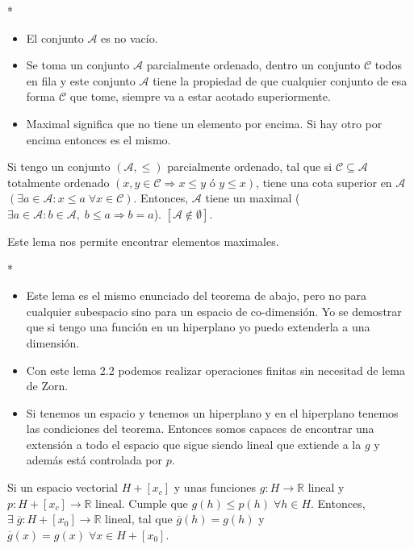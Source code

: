\begin{paracol}{2}
\switchcolumn[1]*{\noindent\scriptsize
\begin{itemize}
    \item El conjunto $\mathscr{A}$ es no vacío.
    \item Se toma un conjunto $\mathscr{A}$ parcialmente ordenado, dentro un conjunto $\mathscr{C}$ todos en fila y este conjunto $\mathscr{A}$ tiene la propiedad de que cualquier conjunto de esa forma $\mathscr{C}$ que tome, siempre va a estar acotado superiormente. 
    \item Maximal significa que no tiene un elemento por encima. Si hay otro por encima entonces es el mismo.
\end{itemize}
}
\switchcolumn[0]\noindent
\begin{lema} Si tengo un conjunto $\left(\mathscr{A},\leq\right)$ parcialmente ordenado, tal que si $\mathscr{C} \subseteq \mathscr{A}$ totalmente ordenado $\left(x,y \in \mathscr{C} \Rightarrow x\leq y \text{ ó } y\leq x\right)$, tiene una cota superior en $\mathscr{A}$ $\left(\exists a\in \mathscr{A}:x\leq a \;\forall x\in \mathscr{C}\right)$. Entonces, $\mathscr{A}$ tiene un maximal ($\exists a \in \mathscr{A}: b \in \mathscr{A},\; b\leq a \Rightarrow b=a$). $\left[\mathscr{A}\notin \emptyset\right]$.
\end{lema}

Este lema nos permite encontrar elementos maximales.

\switchcolumn[1]*{\noindent\scriptsize
    \begin{itemize}
	\item Este lema es el mismo enunciado del teorema de abajo, pero no para cualquier subespacio sino para un espacio de co-dimensión. Yo se demostrar que si tengo una función en un hiperplano yo puedo extenderla a una dimensión. 
	\item Con este lema 2.2 podemos realizar operaciones finitas sin necesitad de lema de Zorn.
	\item Si tenemos un espacio y tenemos un hiperplano y en el hiperplano tenemos las condiciones del teorema. Entonces somos capaces de encontrar una extensión a todo el espacio que sigue siendo lineal que extiende a la $g$ y además está controlada por $p$.
    \end{itemize}
}
\switchcolumn[0]\noindent

\begin{lema}
    Si un espacio vectorial $H+[x_c]$ y unas funciones $g:H\to \mathbb{R}$ lineal y $p:H+[x_c]\to \mathbb{R}$ lineal. Cumple que $g(h)\leq p(h)\; \forall h\in H$. Entonces, $\exists\; \overline{g}:H+[x_0]\to \mathbb{R}$ lineal, tal que $\overline{g}(h)=g(h)$ y $\overline{g}(x)=g(x)\; \forall x\in H+[x_0]$.


\end{lema}
\end{paracol}

